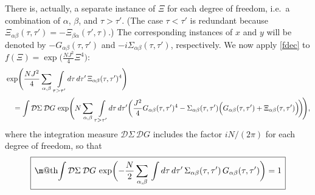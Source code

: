 \documentclass[12pt]{article}
\makeatletter
\newcommand*{\wideboxed}[1]{\setlength{\fboxsep}{1ex}%
  \fbox{\m@th$\displaystyle#1$}}
\newcommand{\calD}{\mathcal{D}}
\def\ie{i.e.\ }
\makeatother
\begin{document}
There is, actually, a separate instance of $\Xi$ for each degree of freedom, \ie a combination of $\alpha$, $\beta$, and $\tau>\tau'$. (The case $\tau<\tau'$ is redundant because $\Xi_{\alpha\beta}(\tau,\tau') =-\Xi_{\beta\alpha}(\tau',\tau)$.) The corresponding instances of $x$ and $y$ will be denoted by $-G_{\alpha\beta}(\tau,\tau')$ and $-i\Sigma_{\alpha\beta}(\tau,\tau')$, respectively. We now apply \eqref{fdec} to $f(\Xi)=\exp\bigl(\frac{NJ^2}{4}\Xi^4\bigr)$:
\begin{align}\label{expXi4}
&\exp\Biggl(\frac{NJ^2}{4}
\sum_{\alpha,\beta}\,\int\limits_{\tau>\tau'}\! d\tau\,d\tau'\,
\Xi_{\alpha\beta}(\tau,\tau')^4\Biggr)\\[2pt]
&\quad=\int\calD\Sigma\: \calD G\,
\exp\Biggl(N\sum_{\alpha,\beta}\,\int\limits_{\tau>\tau'}\! d\tau\,d\tau'
\biggl(\frac{J^2}{4}G_{\alpha\beta}(\tau,\tau')^4
-\Sigma_{\alpha\beta}(\tau,\tau')
\Bigl(G_{\alpha\beta}(\tau,\tau')+\Xi_{\alpha\beta}(\tau,\tau')\Bigr)
\!\biggr)\!\Biggr),\nonumber
\end{align}
where the integration measure $\calD\Sigma\,\calD G$ includes the factor $iN/(2\pi)$ for each degree of freedom, so that
\begin{equation}
\wideboxed{
\int\calD\Sigma\: \calD G\,\exp\biggl(-\frac{N}{2}\sum_{\alpha,\beta}\,
\int d\tau\,d\tau'\,
\Sigma_{\alpha\beta}(\tau,\tau')\,G_{\alpha\beta}(\tau,\tau')\biggr)
=1
}
\end{equation}
\end{document}
